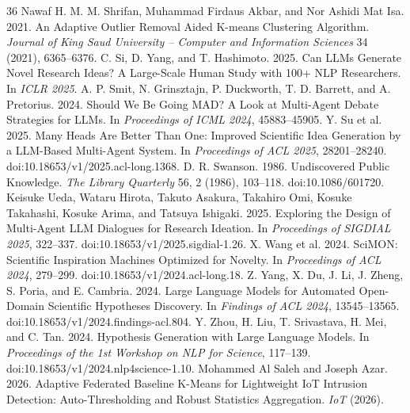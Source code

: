 \documentclass[sigconf,review,anonymous=false]{acmart}
\begin{document}
\begin{thebibliography}{36}
 Nawaf H. M. M. Shrifan, Muhammad Firdaus Akbar, and Nor Ashidi Mat Isa. 2021. An Adaptive Outlier Removal Aided K-means Clustering Algorithm. \emph{Journal of King Saud University -- Computer and Information Sciences} 34 (2021), 6365--6376.
 C. Si, D. Yang, and T. Hashimoto. 2025. Can LLMs Generate Novel Research Ideas? A Large-Scale Human Study with 100+ NLP Researchers. In \emph{ICLR 2025}.
 A. P. Smit, N. Grinsztajn, P. Duckworth, T. D. Barrett, and A. Pretorius. 2024. Should We Be Going MAD? A Look at Multi-Agent Debate Strategies for LLMs. In \emph{Proceedings of ICML 2024}, 45883--45905.
 Y. Su et al. 2025. Many Heads Are Better Than One: Improved Scientific Idea Generation by a LLM-Based Multi-Agent System. In \emph{Proceedings of ACL 2025}, 28201--28240. doi:10.18653/v1/2025.acl-long.1368.
 D. R. Swanson. 1986. Undiscovered Public Knowledge. \emph{The Library Quarterly} 56, 2 (1986), 103--118. doi:10.1086/601720.
 Keisuke Ueda, Wataru Hirota, Takuto Asakura, Takahiro Omi, Kosuke Takahashi, Kosuke Arima, and Tatsuya Ishigaki. 2025. Exploring the Design of Multi-Agent LLM Dialogues for Research Ideation. In \emph{Proceedings of SIGDIAL 2025}, 322--337. doi:10.18653/v1/2025.sigdial-1.26.
 X. Wang et al. 2024. SciMON: Scientific Inspiration Machines Optimized for Novelty. In \emph{Proceedings of ACL 2024}, 279--299. doi:10.18653/v1/2024.acl-long.18.
 Z. Yang, X. Du, J. Li, J. Zheng, S. Poria, and E. Cambria. 2024. Large Language Models for Automated Open-Domain Scientific Hypotheses Discovery. In \emph{Findings of ACL 2024}, 13545--13565. doi:10.18653/v1/2024.findings-acl.804.
 Y. Zhou, H. Liu, T. Srivastava, H. Mei, and C. Tan. 2024. Hypothesis Generation with Large Language Models. In \emph{Proceedings of the 1st Workshop on NLP for Science}, 117--139. doi:10.18653/v1/2024.nlp4science-1.10.
 Mohammed Al Saleh and Joseph Azar. 2026. Adaptive Federated Baseline K-Means for Lightweight IoT Intrusion Detection: Auto-Thresholding and Robust Statistics Aggregation. \emph{IoT} (2026).
\end{thebibliography}
\end{document}
